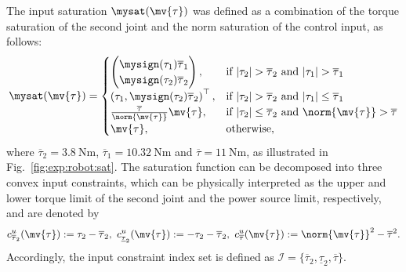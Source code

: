 \documentclass[letterpaper, journal, twoside]{IEEEtran}
\begin{document}
The input saturation $\mysat(\mv{\tau})$ was defined as a combination of the torque saturation of the second joint and the norm saturation of the control input, as follows:
\begin{equation} \label{eq:exp:sat}
  \mysat(\mv{\tau})
  =
  \begin{cases}
    \begin{pmatrix}
      \mysign(\tau_1)\overline{\tau}_1
      \\
      \mysign(\tau_2)\overline{\tau}_2
    \end{pmatrix}
    , &
    \text{if }
    \vert\tau_2\vert > \overline{\tau}_2
    \text{ and }
    \vert\tau_1\vert > \overline{\tau}_1
    \\
    \left(
      \tau_1
      , 
      \mysign(\tau_2)\overline{\tau}_2
    \right)^\top
    , &
    \text{if }
    \vert\tau_2\vert > \overline{\tau}_2
    \text{ and }
    \vert\tau_1\vert \le \overline{\tau}_1
    \\
    \tfrac{\overline{\tau}}{\norm{\mv{\tau}}}\mv{\tau}
    , &
    \text{if }
    |\tau_2| \le \overline{\tau}_2
    \text{ and }
    \norm{\mv{\tau}} > \overline{\tau}
    \\
    \mv{\tau}
    , &
    \text{otherwise}
    ,
  \end{cases}
\end{equation}
where $\overline{\tau}_2=\qty{3.8}{\newton\meter}$, $\overline{\tau}_1=\qty{10.32}{\newton\meter}$ and $\overline{\tau}=\qty{11}{\newton\meter}$, as illustrated in Fig.~\ref{fig:exp:robot:sat}.
The saturation function can be decomposed into three convex input constraints, which can be physically interpreted as the upper and lower torque limit of the second joint and the power source limit, respectively, and are denoted by
\begin{equation} \label{eq:val:cstr:input}
  c^u_{\overline{\tau}_2}(\mv{\tau}) 
  := 
  \tau_2 - \overline{\tau}_2
  ,
  \ 
  c^u_{\underline{\tau}_2}(\mv{\tau}) 
  := 
  -\tau_2 - \overline{\tau}_2
  ,
  \ 
  c^u_{\overline{\tau}}(\mv{\tau})
  := 
  \norm{\mv{\tau}}^2 - \overline{\tau}^2
  .
\end{equation}
Accordingly, the input constraint index set is defined as $\mathcal{I} = \{\overline{\tau}_2, \underline{\tau}_2, \overline{\tau}\}$.
\end{document}
